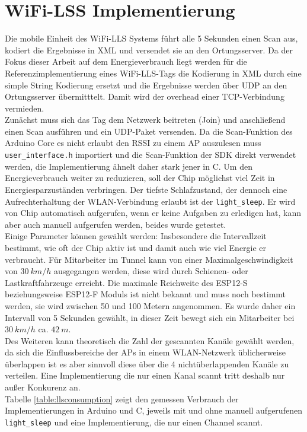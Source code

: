 \section{WiFi-LSS Implementierung}
Die mobile Einheit des WiFi-LLS Systems führt alle 5 Sekunden einen Scan aus, kodiert die Ergebnisse in XML und versendet sie an den Ortungsserver.
Da der Fokus dieser Arbeit auf dem Energieverbrauch liegt werden für die Referenzimplementierung eines WiFi-LLS-Tags die Kodierung in XML durch eine simple String Kodierung ersetzt und die Ergebnisse werden über UDP an den Ortungsserver übermitttelt. 
Damit wird der overhead einer TCP-Verbindung vermieden.\\
Zunächst muss sich das Tag dem Netzwerk beitreten (Join) und anschließend einen Scan ausführen und ein UDP-Paket versenden.
Da die Scan-Funktion des Arduino Core es nicht erlaubt den RSSI zu einem AP auszulesen muss \texttt{user\_interface.h} importiert und die Scan-Funktion der SDK direkt verwendet werden, die Implementierung ähnelt daher stark jener in C.
Um den Energieverbrauch weiter zu reduzieren, soll der Chip möglichst viel Zeit in Energiesparzuständen verbringen.
Der tiefste Schlafzustand, der dennoch eine Aufrechterhaltung der WLAN-Verbindung erlaubt ist der \texttt{light\_sleep}. 
Er wird von Chip automatisch aufgerufen, wenn er keine Aufgaben zu erledigen hat, kann aber auch manuell aufgerufen werden, beides wurde getestet.\\
Einige Parameter können gewählt werden: Insbesondere die Intervallzeit bestimmt, wie oft der Chip aktiv ist und damit auch wie viel Energie er verbraucht.
Für Mitarbeiter im Tunnel kann von einer Maximalgeschwindigkeit von $30\ km/h$ ausgegangen werden, diese wird durch Schienen- oder Lastkraftfahrzeuge erreicht. 
Die maximale Reichweite des ESP12-S beziehungsweise ESP12-F Moduls ist nicht bekannt und muss noch bestimmt werden, sie wird zwischen 50 und 100 Metern angenommen.
Es wurde daher ein Intervall von 5 Sekunden gewählt, in dieser Zeit bewegt sich ein Mitarbeiter bei $30\ km/h$ ca. $42\ m$.\\
Des Weiteren kann theoretisch die Zahl der gescannten Kanäle gewählt werden, da sich die Einflussbereiche der APs in einem WLAN-Netzwerk üblicherweise überlappen ist es aber sinnvoll diese über die 4 nichtüberlappenden Kanäle zu verteilen. 
Eine Implementierung die nur einen Kanal scannt tritt deshalb nur außer Konkurenz an.\\
Tabelle \ref{table:llsconsumption} zeigt den gemessen Verbrauch der Implementierungen in Arduino und C, jeweils mit und ohne manuell aufgerufenen \texttt{light\_sleep} und eine Implementierung, die nur einen Channel scannt.
